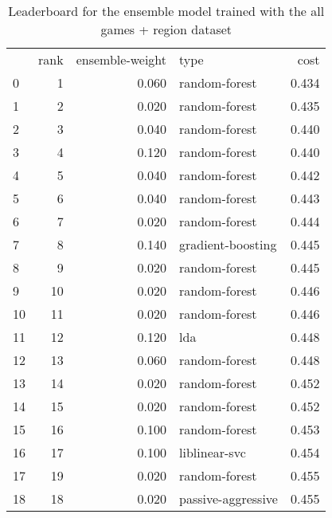 \begin{table}[]
	\centering
	\begin{tabular}{lrrlr}
		   & rank & ensemble-weight & type               & cost  \\
		0  & 1    & 0.060           & random-forest      & 0.434 \\
		1  & 2    & 0.020           & random-forest      & 0.435 \\
		2  & 3    & 0.040           & random-forest      & 0.440 \\
		3  & 4    & 0.120           & random-forest      & 0.440 \\
		4  & 5    & 0.040           & random-forest      & 0.442 \\
		5  & 6    & 0.040           & random-forest      & 0.443 \\
		6  & 7    & 0.020           & random-forest      & 0.444 \\
		7  & 8    & 0.140           & gradient-boosting  & 0.445 \\
		8  & 9    & 0.020           & random-forest      & 0.445 \\
		9  & 10   & 0.020           & random-forest      & 0.446 \\
		10 & 11   & 0.020           & random-forest      & 0.446 \\
		11 & 12   & 0.120           & lda                & 0.448 \\
		12 & 13   & 0.060           & random-forest      & 0.448 \\
		13 & 14   & 0.020           & random-forest      & 0.452 \\
		14 & 15   & 0.020           & random-forest      & 0.452 \\
		15 & 16   & 0.100           & random-forest      & 0.453 \\
		16 & 17   & 0.100           & liblinear-svc      & 0.454 \\
		17 & 19   & 0.020           & random-forest      & 0.455 \\
		18 & 18   & 0.020           & passive-aggressive & 0.455 \\
	\end{tabular}

	\caption{Leaderboard for the ensemble model trained with the all games + region dataset}
	\label{tab:lb-all-games-with-region}
\end{table}

